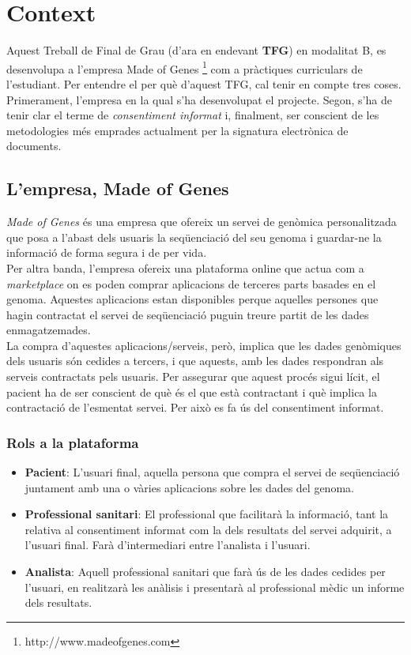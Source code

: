 \section{Context}

Aquest Treball de Final de Grau (d'ara en endevant \textbf{TFG}) en modalitat B, es desenvolupa a l'empresa Made of Genes \footnote{http://www.madeofgenes.com} com a pràctiques curriculars de l'estudiant.
\newline Per entendre el per què d'aquest TFG, cal tenir en compte tres coses. Primerament, l'empresa en la qual s'ha desenvolupat el projecte. 
\newline Segon, s'ha de tenir clar el terme de \textit{consentiment informat} i, finalment, ser conscient de les metodologies més emprades actualment per la signatura electrònica de documents.

\subsection{L'empresa, Made of Genes}
\textit{Made of Genes} és una empresa que ofereix un servei de genòmica personalitzada que posa a l'abast dels usuaris la seqüenciació del seu genoma i guardar-ne la informació de forma segura i de per vida.\\
Per altra banda, l'empresa ofereix una plataforma online que actua com a \textit{marketplace} on es poden comprar aplicacions de terceres parts basades en el genoma.
Aquestes aplicacions estan disponibles perque aquelles persones que hagin contractat el servei de seqüenciació puguin treure partit de les dades enmagatzemades.\\
\newline La compra d'aquestes aplicacions/serveis, però, implica que les dades genòmiques dels usuaris són cedides a  tercers, i que aquests, amb les dades respondran als serveis contractats pels usuaris. 
\newline Per assegurar que aquest procés sigui lícit, el pacient ha de ser conscient de què és el que està contractant i què implica la contractació de l'esmentat servei. Per això es fa ús del consentiment informat.

\subsubsection{Rols a la plataforma}
\begin{itemize}
	\item \textbf{Pacient}: L'usuari final, aquella persona que compra el servei de seqüenciació juntament amb una o vàries aplicacions sobre les dades del genoma.
	\item \textbf{Professional sanitari}: El professional que facilitarà la informació, tant la relativa al consentiment informat com la dels resultats del servei adquirit, a l'usuari final. Farà d'intermediari entre l'analista i l'usuari.
	\item \textbf{Analista}: Aquell professional sanitari que farà ús de les dades cedides per l'usuari, en realitzarà les anàlisis i presentarà al professional mèdic un informe dels resultats.
\end{itemize}

